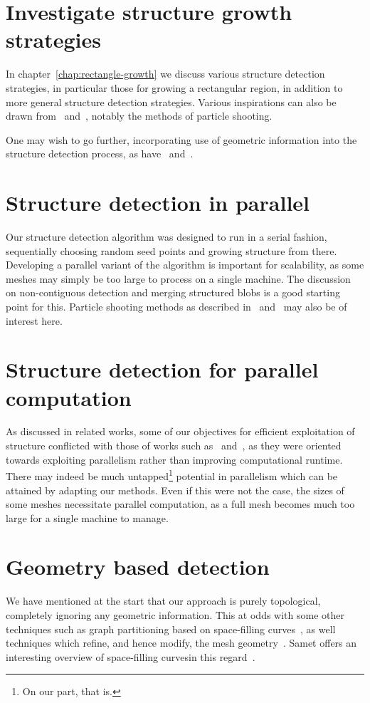 \section{Investigate structure growth strategies}
In chapter~\ref{chap:rectangle-growth} we discuss various structure detection strategies, in particular those for growing a rectangular region, in addition to more general structure detection strategies. Various inspirations can also be drawn from~\cite{eppstein2008motorcycle} and~\cite{eppstein2008approximate}, notably the methods of particle shooting.

One may wish to go further, incorporating use of geometric information into the structure detection process, as have~\cite{makem2012automatic} and~\cite{rocca2011fast}.


\section{Structure detection in parallel}
Our structure detection algorithm was designed to run in a serial fashion, sequentially choosing random seed points and growing structure from there. Developing a parallel variant of the algorithm is important for scalability, as some meshes may simply be too large to process on a single machine. The discussion on non-contiguous detection and merging structured blobs is a good starting point for this. Particle shooting methods as described in~\cite{eppstein2008motorcycle} and~\cite{eppstein2008approximate} may also be of interest here.

\section{Structure detection for parallel computation}
As discussed in related works, some of our objectives for efficient exploitation of structure conflicted with those of works such as~\cite{bergen2004hierarchical} and~\cite{li2004hierarchical}, as they were oriented towards exploiting parallelism rather than improving computational runtime. There may indeed be much untapped\footnote{On our part, that is.} potential in parallelism which can be attained by adapting our methods. Even if this were not the case, the sizes of some meshes necessitate parallel computation, as a full mesh becomes much too large for a single machine to manage.


\section{Geometry based detection}
We have mentioned at the start that our approach is purely topological, completely ignoring any geometric information. This at odds with some other techniques such as graph partitioning based on space-filling curves~\cite{ridley2010guide}, as well techniques which refine, and hence modify, the mesh geometry~\cite{bergen2004hierarchical}. Samet offers an interesting overview of space-filling curvesin this regard~\cite{samet2006foundations}.


